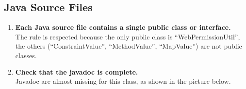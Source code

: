 \documentclass[a4paper,11pt]{report} %
\begin{document}
		\subsection*{Java Source Files}\begin{enumerate}[resume]
			\item \textbf{Each Java source file contains a single public class or interface.}\smallskip \\
				The rule is respected because the only public class is ``WebPermissionUtil'', the others (``ConstraintValue'', ``MethodValue'', ``MapValue'') are not public classes.
			\setcounter{enumi}{21}
			\setcounter{enumi}{22}
			\item \textbf{Check that the javadoc is complete.}\smallskip \\
				Javadoc are almost missing for this class, as shown in the picture below.\bigskip \\
				\begin{minipage}{\linewidth}
				\end{minipage} \linebreak
		\end{enumerate}
		
\end{document}
